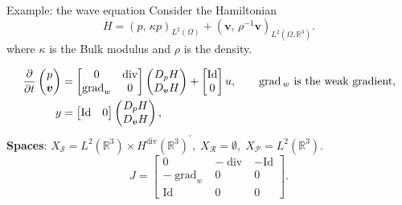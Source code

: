 \documentclass[aspectratio=169]{beamer}
\DeclareMathOperator*{\grad}{grad}
\renewcommand{\div}{\operatorname{div}}
\newcommand{\bbR}{\mathbb{R}}
\newcommand{\inpr}[3][]{\ensuremath{( #2, \, #3 )_{#1}}}
\begin{document}
\begin{frame}{Example: the wave equation}
	Consider the Hamiltonian
	\begin{equation*}
		{H} = \inpr[L^2(\Omega)]{p}{\kappa p} + \inpr[L^2(\Omega, \bbR^3)]{\bm{v}}{\rho^{-1}\bm{v}}.
	\end{equation*}
	where $\kappa$ is the Bulk modulus and $\rho$ is the density. \\
	\vspace{.3cm}
	\begin{tcolorbox}[nobeforeafter, colframe=theme,title=The wave equation on $\bbR^3$ with distributed input]%
	\begin{equation*}
		\begin{aligned}
			\diffp{}{t}
			\begin{pmatrix}
				p \\
				\bm{v} \\
			\end{pmatrix} &=
			\begin{bmatrix}
				0 & \div \\
				\grad_w & 0
			\end{bmatrix}
			\begin{pmatrix}
				D_p{H} \\
				D_{\bm{v}}{H}\\
			\end{pmatrix} + \begin{bmatrix}
				\mathrm{Id} \\
				0
			\end{bmatrix} u, \qquad \grad{}_{w} \text{ is the weak gradient},\\
			y &= \begin{bmatrix}
				\mathrm{Id} & 0
			\end{bmatrix} \begin{pmatrix}
				D_p{H} \\
				D_{\bm{v}}{H}\\
			\end{pmatrix},
		\end{aligned}
	\end{equation*}
	\textbf{Spaces}: $X_{\mathcal{S}}= L^2(\bbR^3) \times H^{\div}(\bbR^3)^{'}, \; X_{\mathcal{R}} = \emptyset, \; X_{\mathcal{P}}= L^{2}(\bbR^3)$.
	\begin{equation*}
		J = \begin{bmatrix}
			0 & -\div & - \mathrm{Id} \\
			-\grad_w & 0 & 0 \\
			\mathrm{Id} & 0 & 0 
		\end{bmatrix}.
	\end{equation*}
	\end{tcolorbox} 
	


\end{frame}
\end{document}
